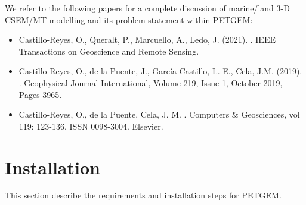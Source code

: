 \documentclass[letterpaper,10pt,english]{sphinxmanual}
\begin{document}
We refer to the following papers for a complete discussion of
marine/land 3-D CSEM/MT modelling and its problem statement within PETGEM:
\begin{itemize}
\item {} 
Castillo-Reyes, O., Queralt, P., Marcuello, A., Ledo, J. (2021). . IEEE Transactions on Geoscience and Remote Sensing.

\item {} 
Castillo-Reyes, O., de la Puente, J., García-Castillo, L. E., Cela, J.M. (2019). . Geophysical Journal International, Volume 219, Issue 1, October 2019, Pages 39\textendash{}65.

\item {} 
Castillo-Reyes, O., de la Puente, Cela, J. M. . Computers \& Geosciences, vol 119: 123-136. ISSN 0098-3004. Elsevier.

\end{itemize}


\chapter{Installation}
\label{\detokenize{Installation:installation}}\label{\detokenize{Installation:id1}}\label{\detokenize{Installation::doc}}
This section describe the requirements and installation steps for PETGEM.
\end{document}
